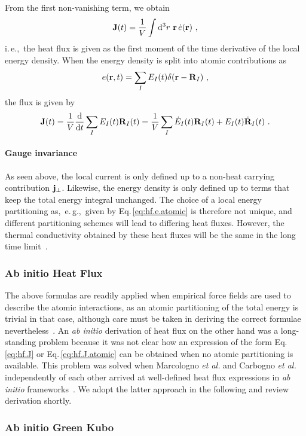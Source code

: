 From the first non-vanishing term, we obtain
\begin{align}
	{\bf J} (t) = \frac{1}{V} \int {\rm d}^3 r ~ {\bf r} \, \dot{e} ({\bf r})~,
	\label{eq:hf.J}
\end{align}
i.\,e.,~the heat flux is given as the first moment of the time derivative of the local energy density. When the energy density is split into atomic contributions as
\begin{align}
	e ({\bf r}, t ) = \sum_I E_I (t) \delta ({\bf r} - {\bf R}_I)~,
	\label{eq:hf.e.atomic}
\end{align}
the flux is given by
\begin{align}
	{\bf J} (t) 
		= \frac{1}{V} \frac{{\rm d}}{{\rm d} t} \sum_I E_I(t) {\bf R}_I(t)
		= \frac{1}{V} \sum_I \dot{E}_I (t) {\bf R}_I (t) + E_I (t) \dot{{\bf R}}_I (t)~.
	\label{eq:hf.J.atomic}
\end{align}

\paragraph{Gauge invariance}
As seen above, the local current is only defined up to a non-heat carrying contribution ${\bf j}_{\perp}$. Likewise, the energy density is only defined up to terms that keep the total energy integral unchanged. The choice of a local energy partitioning as,~e.\,g.,~given by Eq.\,\eqref{eq:hf.e.atomic} is therefore not unique, and different partitioning schemes will lead to differing heat fluxes. However, the thermal conductivity obtained by these heat fluxes will be the same in the long time limit~\cite{Ercole2016}.

\subsubsection{Ab initio Heat Flux}
The above formulas are readily applied when empirical force fields are used to describe the atomic interactions, as an atomic partitioning of the total energy is trivial in that case, although care must be taken in deriving the correct formulae nevertheless~\cite{Fan2015,Boone2019}. An \emph{ab initio} derivation of heat flux on the other hand was a long-standing problem because it was not clear how an expression of the form Eq.\,\eqref{eq:hf.J} or Eq.\,\eqref{eq:hf.J.atomic} can be obtained when no atomic partitioning is available. This problem was solved when Marcologno \emph{et al.} and Carbogno \emph{et al.} independently of each other arrived at well-defined heat flux expressions in \emph{ab initio} frameworks~\cite{Marcolongo2016,Carbogno2016}. We adopt the latter approach in the following and review derivation shortly.


\subsubsection{Ab initio Green Kubo}